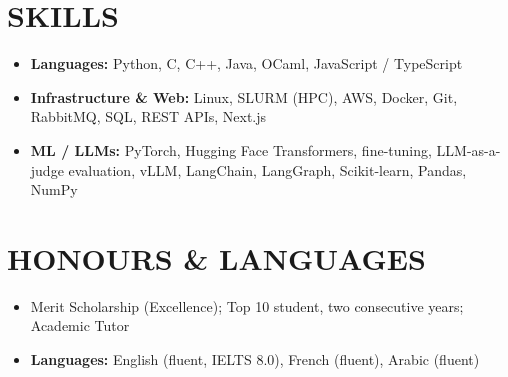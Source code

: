 \documentclass[10pt, a4paper]{article}
\begin{document}
\section*{SKILLS}
\begin{itemize}
    \item \textbf{Languages:} Python, C, C++, Java, OCaml, JavaScript / TypeScript
    \item \textbf{Infrastructure \& Web:} Linux, SLURM (HPC), AWS, Docker, Git, RabbitMQ, SQL, REST APIs, Next.js
    \item \textbf{ML / LLMs:} PyTorch, Hugging Face Transformers, fine-tuning, LLM-as-a-judge evaluation, vLLM, LangChain, LangGraph, Scikit-learn, Pandas, NumPy
\end{itemize}

\section*{HONOURS \& LANGUAGES}
\begin{itemize}
    \item Merit Scholarship (Excellence); Top 10 student, two consecutive years; Academic Tutor
    \item \textbf{Languages:} English (fluent, IELTS 8.0), French (fluent), Arabic (fluent)
\end{itemize}
\end{document}
